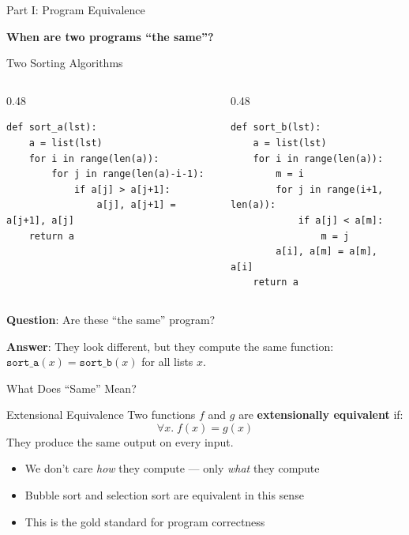 \documentclass[aspectratio=169,11pt]{beamer}
\begin{document}
\begin{frame}{Part I: Program Equivalence}
\begin{center}
\Huge \textbf{When are two programs ``the same''?}
\end{center}
\end{frame}

\begin{frame}[fragile]{Two Sorting Algorithms}
\begin{columns}
\begin{column}{0.48\textwidth}
\begin{lstlisting}[language=deppy,title={\textbf{Bubble Sort}}]
def sort_a(lst):
    a = list(lst)
    for i in range(len(a)):
        for j in range(len(a)-i-1):
            if a[j] > a[j+1]:
                a[j], a[j+1] = a[j+1], a[j]
    return a
\end{lstlisting}
\end{column}
\begin{column}{0.48\textwidth}
\begin{lstlisting}[language=deppy,title={\textbf{Selection Sort}}]
def sort_b(lst):
    a = list(lst)
    for i in range(len(a)):
        m = i
        for j in range(i+1, len(a)):
            if a[j] < a[m]:
                m = j
        a[i], a[m] = a[m], a[i]
    return a
\end{lstlisting}
\end{column}
\end{columns}

\vspace{1em}
\textbf{Question}: Are these ``the same'' program?

\textbf{Answer}: They look different, but they compute the same
function: $\mathtt{sort\_a}(x) = \mathtt{sort\_b}(x)$ for all lists $x$.
\end{frame}

\begin{frame}{What Does ``Same'' Mean?}
\begin{block}{Extensional Equivalence}
Two functions $f$ and $g$ are \textbf{extensionally equivalent} if:
\[
  \forall x.\; f(x) = g(x)
\]
They produce the same output on every input.
\end{block}

\vspace{0.5em}
\begin{itemize}
\item We don't care \emph{how} they compute --- only \emph{what} they compute
\item Bubble sort and selection sort are equivalent in this sense
\item This is the gold standard for program correctness
\end{itemize}
\end{frame}
\end{document}
